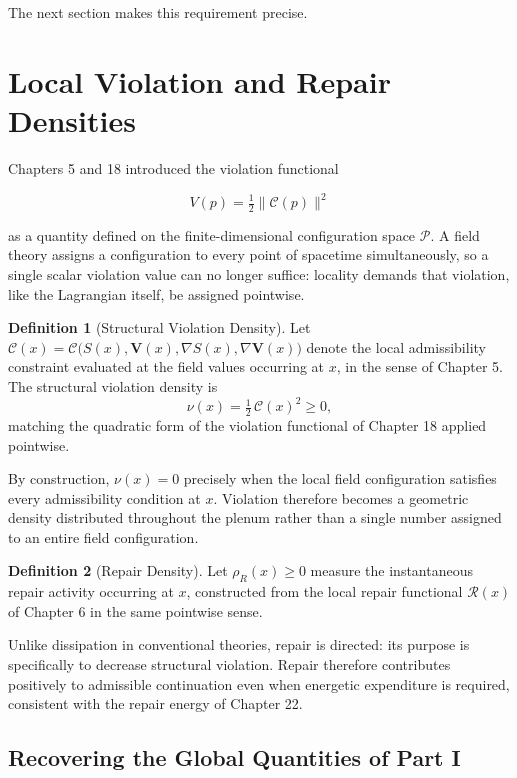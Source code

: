 \documentclass[11pt,oneside]{book}
\numberwithin{equation}{chapter}
\theoremstyle{definition}
\newtheorem{definition}{Definition}[chapter]
\theoremstyle{plain}
\begin{document}
The next section makes this requirement precise.

\section{Local Violation and Repair Densities}

Chapters 5 and 18 introduced the violation functional

\[
V(p)=\tfrac12\|\mathcal C(p)\|^2
\]

as a quantity defined on the finite-dimensional configuration space
\(\mathcal P\). A field theory assigns a configuration to every point of
spacetime simultaneously, so a single scalar violation value can no longer
suffice: locality demands that violation, like the Lagrangian itself, be
assigned pointwise.

\begin{definition}[Structural Violation Density]
Let \(\mathcal C(x)=\mathcal C\bigl(S(x),\mathbf V(x),\nabla S(x),\nabla
\mathbf V(x)\bigr)\) denote the local admissibility constraint evaluated at
the field values occurring at \(x\), in the sense of Chapter 5. The
structural violation density is
\[
\nu(x)
=
\tfrac12\,\mathcal C(x)^2
\ge 0,
\]
matching the quadratic form of the violation functional of Chapter 18
applied pointwise.
\end{definition}

By construction, \(\nu(x)=0\) precisely when the local field configuration
satisfies every admissibility condition at \(x\). Violation therefore
becomes a geometric density distributed throughout the plenum rather than a
single number assigned to an entire field configuration.

\begin{definition}[Repair Density]
Let \(\rho_R(x)\ge 0\) measure the instantaneous repair activity occurring
at \(x\), constructed from the local repair functional \(\mathcal R(x)\) of
Chapter 6 in the same pointwise sense.
\end{definition}

Unlike dissipation in conventional theories, repair is directed: its purpose
is specifically to decrease structural violation. Repair therefore
contributes positively to admissible continuation even when energetic
expenditure is required, consistent with the repair energy of Chapter 22.

\subsection*{Recovering the Global Quantities of Part I}
\end{document}
